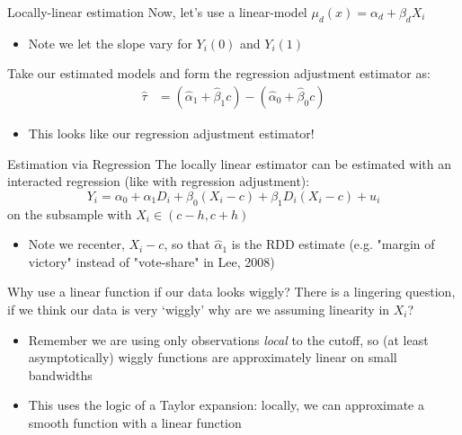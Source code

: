 \documentclass[aspectratio=169,t,11pt,table]{beamer}
\begin{document}
\begin{frame}{Locally-linear estimation}{}
  Now, let's use a linear-model $\mu_d(x) = \alpha_d + \beta_d X_i$
  \begin{itemize}
    \item Note we let the slope vary for $Y_i(0)$ and $Y_i(1)$
  \end{itemize}

  \bigskip
  Take our estimated models and form the regression adjustment estimator as:
  \begin{align*}
    \hat{\tau} 
    &= \left( \hat{\alpha}_1 + \hat{\beta}_1 c \right) - \left( \hat{\alpha}_0 + \hat{\beta}_0 c \right)
  \end{align*}
  \begin{itemize}
    \item This looks like our regression adjustment estimator!
  \end{itemize}
\end{frame}

\begin{frame}{Estimation via Regression}{}
  The locally linear estimator can be estimated with an interacted regression (like with regression adjustment):
  $$
    Y_i = \alpha_0 + \alpha_1 D_i + \beta_0 (X_i - c) + \beta_1 D_i (X_i - c) + u_i
  $$
  on the subsample with $X_i \in (c-h, c+h)$

  \begin{itemize}
    \item Note we recenter, $X_i - c$, so that $\hat{\alpha}_1$ is the RDD estimate (e.g. "margin of victory" instead of "vote-share" in Lee, 2008)
  \end{itemize}
\end{frame}


\begin{frame}{Why use a linear function if our data looks wiggly?}
  There is a lingering question, if we think our data is very `wiggly' why are we assuming linearity in $X_i$?

  \begin{itemize}
    \item Remember we are using only observations \emph{local} to the cutoff, so (at least asymptotically) wiggly functions are approximately linear on small bandwidths
    
    \item This uses the logic of a Taylor expansion: locally, we can approximate a smooth function with a linear function
  \end{itemize}
\end{frame}
\end{document}

